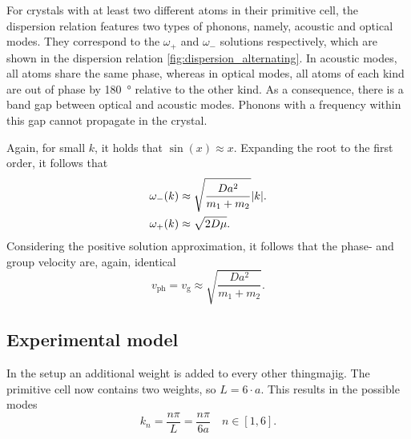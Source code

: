 For crystals with at least two different atoms in their primitive cell, the dispersion relation features two types of phonons, namely, acoustic and optical modes.
They correspond to the $\omega_{+}$ and $\omega_{-}$ solutions respectively, which are shown in the dispersion relation \autoref{fig:dispersion_alternating}.
In acoustic modes, all atoms share the same phase, whereas in optical modes, all atoms of each kind are out of phase by \SI{180}{\degree} relative to the other kind.
As a consequence, there is a band gap between optical and acoustic modes.
Phonons with a frequency within this gap cannot propagate  in the crystal.

Again, for small $k$, it holds that $\sin(x)\approx x$.
Expanding the root to the first order, it follows that
\begin{align*}
	\omega_{-}(k) &\approx \sqrt{\frac{Da^2}{m_1+m_2}}\abs{k}. \\
	\omega_{+}(k) &\approx \sqrt{2D\mu}.
\end{align*}
Considering the positive solution approximation, it follows that the phase- and group velocity are, again, identical
\begin{equation}\label{eq:sound_alternating}
	v_\text{ph} = v_\text{g}\approx \sqrt{\frac{Da^2}{m_1+m_2}}.
\end{equation}
\subsection{Experimental model}\label{subsec:exp_mod_alternating}
In the setup an additional weight is added to every other thingmajig.
The primitive cell now contains two weights, so $L=\num{6}\cdot a$.
This results in the possible modes
\begin{equation*}
	k_n = \frac{n\pi}{L} = \frac{n\pi}{\num{6}a}\quad n\in[1, 6].
\end{equation*}
